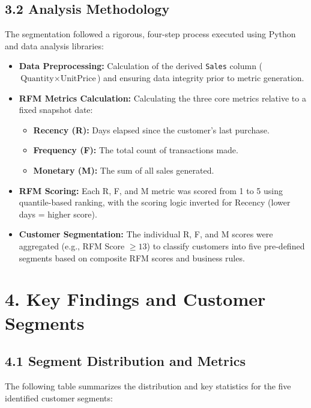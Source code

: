 \documentclass{article}
\begin{document}
\subsection*{3.2 Analysis Methodology}
The segmentation followed a rigorous, four-step process executed using Python and data analysis libraries:
\begin{itemize}
    \item \textbf{Data Preprocessing:} Calculation of the derived \texttt{Sales} column ($\text{Quantity} \times \text{UnitPrice}$) and ensuring data integrity prior to metric generation.
    \item \textbf{RFM Metrics Calculation:} Calculating the three core metrics relative to a fixed snapshot date:
    \begin{itemize}
        \item \textbf{Recency (R):} Days elapsed since the customer's last purchase.
        \item \textbf{Frequency (F):} The total count of transactions made.
        \item \textbf{Monetary (M):} The sum of all sales generated.
    \end{itemize}
    \item \textbf{RFM Scoring:} Each R, F, and M metric was scored from 1 to 5 using quantile-based ranking, with the scoring logic inverted for Recency (lower days = higher score).
    \item \textbf{Customer Segmentation:} The individual R, F, and M scores were aggregated (e.g., RFM Score $\ge 13$) to classify customers into five pre-defined segments based on composite RFM scores and business rules.
\end{itemize}

\section*{4. Key Findings and Customer Segments}

\subsection*{4.1 Segment Distribution and Metrics}
The following table summarizes the distribution and key statistics for the five identified customer segments:
\end{document}
